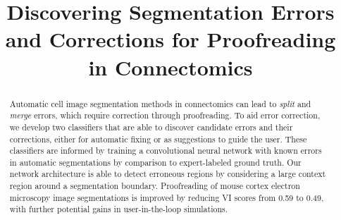 \documentclass{llncs}
\begin{document}
%
\title{Discovering Segmentation Errors and Corrections for Proofreading in Connectomics}
%
%
%
%
%

\maketitle              %

\begin{abstract}
Automatic cell image segmentation methods in connectomics can lead to \emph{split} and \emph{merge} errors, which require correction through proofreading. To aid error correction, we develop two classifiers that are able to discover candidate errors and their corrections, either for automatic fixing or as suggestions to guide the user. These classifiers are informed by training a convolutional neural network with known errors in automatic segmentations by comparison to expert-labeled ground truth. Our network architecture is able to detect erroneous regions by considering a large context region around a segmentation boundary. Proofreading of mouse cortex electron microscopy image segmentations is improved by reducing VI scores from 0.59 to 0.49, with further potential gains in user-in-the-loop simulations.
\end{abstract}
%

%


%


%
%


\end{document}

